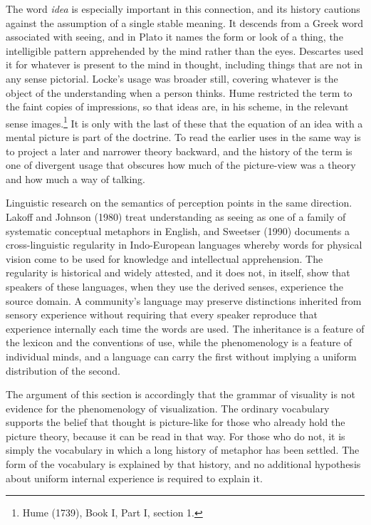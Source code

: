\documentclass[11pt]{article}
\theoremstyle{remark}
\begin{document}
The word \emph{idea} is especially important in this connection, and its history cautions against the assumption of a single stable meaning. It descends from a Greek word associated with seeing, and in Plato it names the form or look of a thing, the intelligible pattern apprehended by the mind rather than the eyes. Descartes used it for whatever is present to the mind in thought, including things that are not in any sense pictorial. Locke's usage was broader still, covering whatever is the object of the understanding when a person thinks. Hume restricted the term to the faint copies of impressions, so that ideas are, in his scheme, in the relevant sense images.\footnote{Hume (1739), Book I, Part I, section 1.} It is only with the last of these that the equation of an idea with a mental picture is part of the doctrine. To read the earlier uses in the same way is to project a later and narrower theory backward, and the history of the term is one of divergent usage that obscures how much of the picture-view was a theory and how much a way of talking.

Linguistic research on the semantics of perception points in the same direction. Lakoff and Johnson (1980) treat understanding as seeing as one of a family of systematic conceptual metaphors in English, and Sweetser (1990) documents a cross-linguistic regularity in Indo-European languages whereby words for physical vision come to be used for knowledge and intellectual apprehension. The regularity is historical and widely attested, and it does not, in itself, show that speakers of these languages, when they use the derived senses, experience the source domain. A community's language may preserve distinctions inherited from sensory experience without requiring that every speaker reproduce that experience internally each time the words are used. The inheritance is a feature of the lexicon and the conventions of use, while the phenomenology is a feature of individual minds, and a language can carry the first without implying a uniform distribution of the second.

The argument of this section is accordingly that the grammar of visuality is not evidence for the phenomenology of visualization. The ordinary vocabulary supports the belief that thought is picture-like for those who already hold the picture theory, because it can be read in that way. For those who do not, it is simply the vocabulary in which a long history of metaphor has been settled. The form of the vocabulary is explained by that history, and no additional hypothesis about uniform internal experience is required to explain it.
\end{document}
